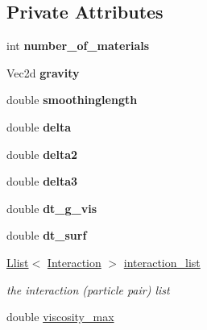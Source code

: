 \subsection*{Private Attributes}
\begin{CompactItemize}
\item 
\hypertarget{classHydrodynamics_74497f44758886505ffdea8972919a6b}{
int \textbf{number\_\-of\_\-materials}}
\label{classHydrodynamics_74497f44758886505ffdea8972919a6b}

\item 
\hypertarget{classHydrodynamics_6f7660b8e3c861315c421a7baac8e81e}{
Vec2d \textbf{gravity}}
\label{classHydrodynamics_6f7660b8e3c861315c421a7baac8e81e}

\item 
\hypertarget{classHydrodynamics_5d05d80cca5039ade949fd272261ed57}{
double \textbf{smoothinglength}}
\label{classHydrodynamics_5d05d80cca5039ade949fd272261ed57}

\item 
\hypertarget{classHydrodynamics_d70d17be4ff45e1b01aaa779771a27e0}{
double \textbf{delta}}
\label{classHydrodynamics_d70d17be4ff45e1b01aaa779771a27e0}

\item 
\hypertarget{classHydrodynamics_74ed6f3fd3d1a615fceea4aa926add37}{
double \textbf{delta2}}
\label{classHydrodynamics_74ed6f3fd3d1a615fceea4aa926add37}

\item 
\hypertarget{classHydrodynamics_d39804d0ef02e7bbced89f22f6980867}{
double \textbf{delta3}}
\label{classHydrodynamics_d39804d0ef02e7bbced89f22f6980867}

\item 
\hypertarget{classHydrodynamics_50784f838fa0e34eca594e9eb99a2bb0}{
double \textbf{dt\_\-g\_\-vis}}
\label{classHydrodynamics_50784f838fa0e34eca594e9eb99a2bb0}

\item 
\hypertarget{classHydrodynamics_666c0e9c93f1b3fbc0d6b8dd0e697f3e}{
double \textbf{dt\_\-surf}}
\label{classHydrodynamics_666c0e9c93f1b3fbc0d6b8dd0e697f3e}

\item 
\hypertarget{classHydrodynamics_5b155497d0ab985266f7dcf4448c2253}{
\hyperlink{classLlist}{Llist}$<$ \hyperlink{classInteraction}{Interaction} $>$ \hyperlink{classHydrodynamics_5b155497d0ab985266f7dcf4448c2253}{interaction\_\-list}}
\label{classHydrodynamics_5b155497d0ab985266f7dcf4448c2253}

\begin{CompactList}\small\item\em the interaction (particle pair) list \item\end{CompactList}\item 
\hypertarget{classHydrodynamics_9f6ba4a1659ccd79a80b5a0291c7c5a0}{
double \hyperlink{classHydrodynamics_9f6ba4a1659ccd79a80b5a0291c7c5a0}{viscosity\_\-max}}
\label{classHydrodynamics_9f6ba4a1659ccd79a80b5a0291c7c5a0}


\end{CompactItemize}
